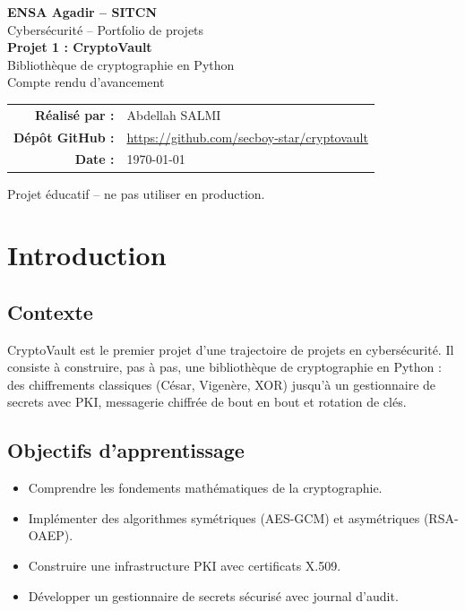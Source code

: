 \documentclass[11pt,a4paper]{article}
\newcommand{\auteur}{Abdellah SALMI}
\newcommand{\filiere}{ENSA Agadir -- SITCN}
\newcommand{\depot}{https://github.com/secboy-star/cryptovault}
\begin{document}
\hypersetup{pageanchor=false}
\begin{titlepage}
  \centering
  \vspace*{1.5cm}
  {\large\color{ensablue}\textbf{\filiere}}\\[0.4cm]
  {\small Cybers\'ecurit\'e -- Portfolio de projets}\\[2.5cm]

  {\Huge\bfseries\color{ensablue} Projet 1 : CryptoVault}\\[0.6cm]
  {\Large Biblioth\`eque de cryptographie en Python}\\[0.3cm]
  {\large Compte rendu d'avancement}\\[2.5cm]

  \begin{tabular}{rl}
    \textbf{R\'ealis\'e par :} & \auteur\\[4pt]
    \textbf{D\'ep\^ot GitHub :} & \url{\depot}\\[4pt]
    \textbf{Date :} & \today
  \end{tabular}

  \vfill
  {\small Projet \'educatif -- ne pas utiliser en production.}
\end{titlepage}
\hypersetup{pageanchor=true}

\tableofcontents
\newpage

\section{Introduction}

\subsection{Contexte}
CryptoVault est le premier projet d'une trajectoire de projets en cybers\'ecurit\'e.
Il consiste \`a construire, pas \`a pas, une biblioth\`eque de cryptographie en Python :
des chiffrements classiques (C\'esar, Vigen\`ere, XOR) jusqu'\`a un gestionnaire de
secrets avec PKI, messagerie chiffr\'ee de bout en bout et rotation de cl\'es.

\subsection{Objectifs d'apprentissage}
\begin{itemize}
  \item Comprendre les fondements math\'ematiques de la cryptographie.
  \item Impl\'ementer des algorithmes sym\'etriques (AES-GCM) et asym\'etriques (RSA-OAEP).
  \item Construire une infrastructure PKI avec certificats X.509.
  \item D\'evelopper un gestionnaire de secrets s\'ecuris\'e avec journal d'audit.
\end{itemize}
\end{document}
